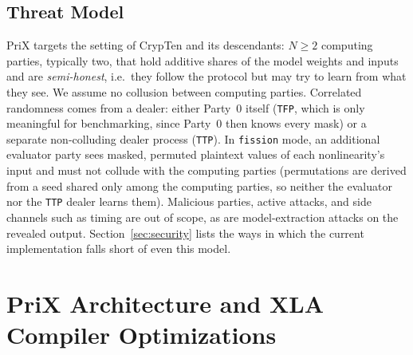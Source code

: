 \documentclass[11pt]{article}
\begin{document}
\subsection{Threat Model}
\label{sec:threat}
PriX targets the setting of CrypTen and its descendants: $N \ge 2$ computing parties, typically two, that hold additive shares of the model weights and inputs and are \emph{semi-honest}, i.e.\ they follow the protocol but may try to learn from what they see. We assume no collusion between computing parties. Correlated randomness comes from a dealer: either Party~0 itself (\texttt{TFP}, which is only meaningful for benchmarking, since Party~0 then knows every mask) or a separate non-colluding dealer process (\texttt{TTP}). In \texttt{fission} mode, an additional evaluator party sees masked, permuted plaintext values of each nonlinearity's input and must not collude with the computing parties (permutations are derived from a seed shared only among the computing parties, so neither the evaluator nor the \texttt{TTP} dealer learns them). Malicious parties, active attacks, and side channels such as timing are out of scope, as are model-extraction attacks on the revealed output. Section~\ref{sec:security} lists the ways in which the current implementation falls short of even this model.

\section{PriX Architecture and XLA Compiler Optimizations}
\label{sec:architecture}
\end{document}
